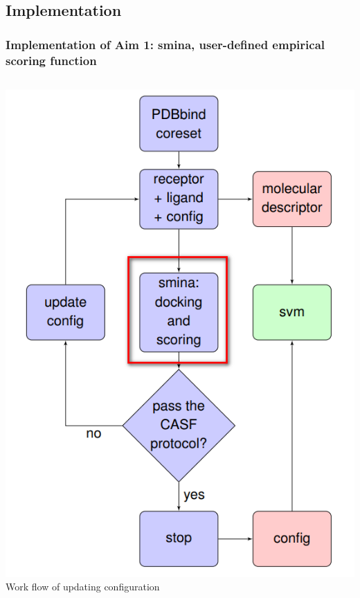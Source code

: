 \subsection{Implementation}


\begin{frame}[fragile]
\frametitle{Implementation of Aim 1: smina, user-defined empirical scoring function}
   \begin{columns}
       \begin{column}{0.4\textwidth}
        \includegraphics[height=0.8\textheight]{../figures/method_smina.png}\\
      {\scriptsize Work flow of updating configuration}
    \end{column}

\end{columns}
\end{frame}
